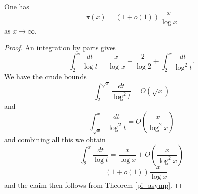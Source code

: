 \begin{corollary}[pi-alt]
\label{pi_alt}
\leanok
One has
  $$ \pi(x) = (1+o(1)) \frac{x}{\log x}$$
  as $x \to \infty$.
\end{corollary}
\begin{proof}
\leanok
An integration by parts gives
  $$ \int_2^x \frac{dt}{\log t} = \frac{x}{\log x} - \frac{2}{\log 2} +
  \int_2^x \frac{dt}{\log^2 t}.$$
  We have the crude bounds
  $$ \int_2^{\sqrt{x}} \frac{dt}{\log^2 t} = O( \sqrt{x} )$$
  and
  $$ \int_{\sqrt{x}}^x \frac{dt}{\log^2 t} = O( \frac{x}{\log^2 x} )$$
  and combining all this we obtain
  $$ \int_2^x \frac{dt}{\log t} = \frac{x}{\log x} + O( \frac{x}{\log^2 x} )$$
  $$ = (1+o(1)) \frac{x}{\log x}$$
  and the claim then follows from Theorem \ref{pi_asymp}.
\end{proof}
